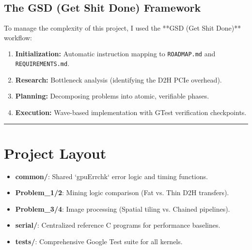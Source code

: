 \documentclass[11pt]{article}
\begin{document}
\subsection*{The GSD (Get Shit Done) Framework}
To manage the complexity of this project, I used the **GSD (Get Shit Done)** workflow:
\begin{enumerate}[label=\alph*.]
    \item \textbf{Initialization:} Automatic instruction mapping to \texttt{ROADMAP.md} and \texttt{REQUIREMENTS.md}.
    \item \textbf{Research:} Bottleneck analysis (identifying the D2H PCIe overhead).
    \item \textbf{Planning:} Decomposing problems into atomic, verifiable phases.
    \item \textbf{Execution:} Wave-based implementation with GTest verification checkpoints.
\end{enumerate}

\noindent\rule{\textwidth}{0.4pt}

\section*{\color{white}Project Layout}
\begin{itemize}
    \item \textbf{common/}: Shared `gpuErrchk` error logic and timing functions.
    \item \textbf{Problem\_1/2}: Mining logic comparison (Fat vs. Thin D2H transfers).
    \item \textbf{Problem\_3/4}: Image processing (Spatial tiling vs. Chained pipelines).
    \item \textbf{serial/}: Centralized reference C programs for performance baselines.
    \item \textbf{tests/}: Comprehensive Google Test suite for all kernels.
\end{itemize}
\end{document}

